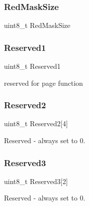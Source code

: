 \subsubsection{\texorpdfstring{Red\+Mask\+Size}{RedMaskSize}}
{\footnotesize\ttfamily uint8\+\_\+t Red\+Mask\+Size}

\hypertarget{struct____attribute_____a604037992fe7e5fd08e1bcc684a1b12d}{}\label{struct____attribute_____a604037992fe7e5fd08e1bcc684a1b12d} 
\subsubsection{\texorpdfstring{Reserved1}{Reserved1}}
{\footnotesize\ttfamily uint8\+\_\+t Reserved1}



reserved for page function 

\hypertarget{struct____attribute_____a09b5824ec5c67bee2a4b36c0ab5181bc}{}\label{struct____attribute_____a09b5824ec5c67bee2a4b36c0ab5181bc} 
\subsubsection{\texorpdfstring{Reserved2}{Reserved2}}
{\footnotesize\ttfamily uint8\+\_\+t Reserved2\mbox{[}4\mbox{]}}



Reserved -\/ always set to 0. 

\hypertarget{struct____attribute_____a2455a82e0d8cc0e8d76e8cf77a68bd39}{}\label{struct____attribute_____a2455a82e0d8cc0e8d76e8cf77a68bd39} 
\subsubsection{\texorpdfstring{Reserved3}{Reserved3}}
{\footnotesize\ttfamily uint8\+\_\+t Reserved3\mbox{[}2\mbox{]}}



Reserved -\/ always set to 0. 

